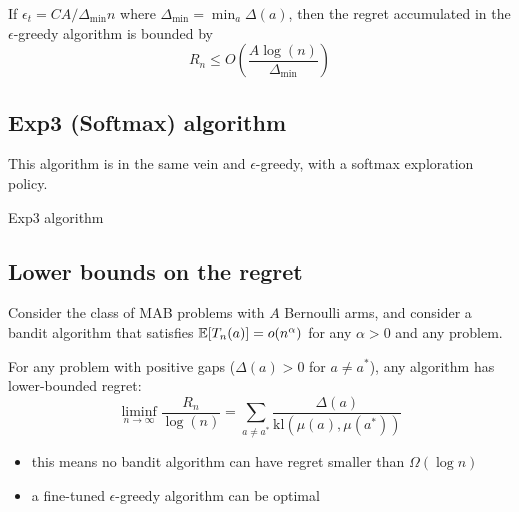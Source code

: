 \documentclass[../course-notes.tex]{subfiles}
\begin{document}
\begin{prop}
	If $\epsilon_t = CA/{\Delta_{\min{}}n}$ where $\Delta_{\min{}} = \min_a \Delta(a)$, then the regret accumulated in the $\epsilon$-greedy algorithm is bounded by
	\begin{equation}
	R_n \leq O\left(
		\frac{A\log(n)}{\Delta_{\min{}}}
	\right)
	\end{equation}
\end{prop}


\subsection{Exp3 (Softmax) algorithm}

This algorithm is in the same vein and $\epsilon$-greedy, with a softmax exploration policy.
\begin{algorithm}\caption{Exp3 algorithm}
\end{algorithm}


\subsection{Lower bounds on the regret}


\begin{prop}\label{prop:BanditLowerBoundPbDepend}
Consider the class of MAB problems with $A$ Bernoulli arms, and consider a bandit algorithm that satisfies $\operatorname{\mathbb{E}}[T_n(a)] = o(n^\alpha)$ for any $\alpha > 0$ and any problem.

For any problem with positive gaps ($\Delta(a) > 0$ for $a\neq a^*$), any algorithm has lower-bounded regret:
\begin{equation}
	\liminf_{n\to\infty} \frac{R_n}{\log(n)}
	=
	\sum_{a\neq a^*} \frac{\Delta(a)}{\mathrm{kl}(\mu(a), \mu(a^*))}
\end{equation}
\end{prop}

\begin{itemize}
	\item this means no bandit algorithm can have regret smaller than $\Omega(\log n)$
	\item a fine-tuned $\epsilon$-greedy algorithm can be optimal
\end{itemize}
\end{document}
